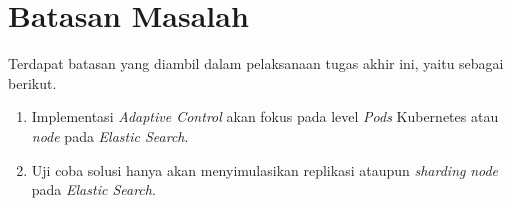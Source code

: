 \section{Batasan Masalah}

Terdapat batasan yang diambil dalam pelaksanaan tugas akhir ini, yaitu sebagai berikut.

\begin{enumerate}
    \item Implementasi \textit{Adaptive Control} akan fokus pada level \textit{Pods} Kubernetes atau \textit{node} pada \textit{Elastic Search}.
    \item Uji coba solusi hanya akan menyimulasikan replikasi ataupun \textit{sharding} \textit{node} pada \textit{Elastic Search}.
 \end{enumerate}


